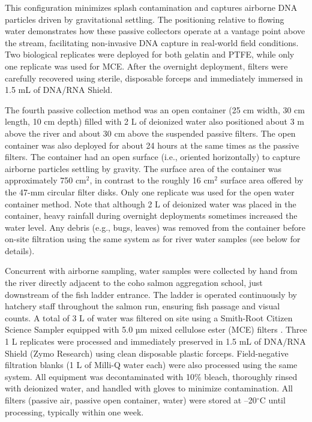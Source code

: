 \documentclass{article}
\begin{document}
This configuration minimizes splash contamination and captures airborne DNA particles driven by gravitational settling. The positioning relative to flowing water demonstrates how these passive collectors operate at a vantage point above the stream, facilitating non-invasive DNA capture in real-world field conditions. Two biological replicates were deployed for both gelatin and PTFE, while only one replicate was used for MCE. After the overnight deployment, filters were carefully recovered using sterile, disposable forceps and immediately immersed in 1.5 mL of DNA/RNA Shield. 

The fourth passive collection method was an open container (25 cm width, 30 cm length, 10 cm depth) filled with 2 L of deionized water \cite{klepke2022} also positioned about 3 m above the river and about 30 cm above the suspended passive filters. The open container was also deployed for about 24 hours at the same times as the passive filters. The container had an open surface (i.e., oriented horizontally) to capture airborne particles settling by gravity. The surface area of the container was approximately 750 cm$^2$, in contrast to the roughly 16 cm$^2$ surface area offered by the 47-mm circular filter disks. Only one replicate was used for the open water container method. Note that although 2 L of deionized water was placed in the container, heavy rainfall during overnight deployments sometimes increased the water level. Any debris (e.g., bugs, leaves) was removed from the container before on-site filtration using the same system as for river water samples (see below for details).

Concurrent with airborne sampling, water samples were collected by hand from the river directly adjacent to the coho salmon aggregation school, just downstream of the fish ladder entrance. The ladder is operated continuously by hatchery staff throughout the salmon run, ensuring fish passage and visual counts. A total of 3 L of water was filtered on site using a Smith-Root Citizen Science Sampler equipped with 5.0 µm mixed cellulose ester (MCE) filters \cite{allan2023}. Three 1 L replicates were processed and immediately preserved in 1.5 mL of DNA/RNA Shield (Zymo Research) using clean disposable plastic forceps. Field-negative filtration blanks (1 L of Milli-Q water each) were also processed using the same system. All equipment was decontaminated with 10\% bleach, thoroughly rinsed with deionized water, and handled with gloves to minimize contamination. All filters (passive air, passive open container, water) were stored at –20$^\circ$C until processing, typically within one week.
\end{document}

